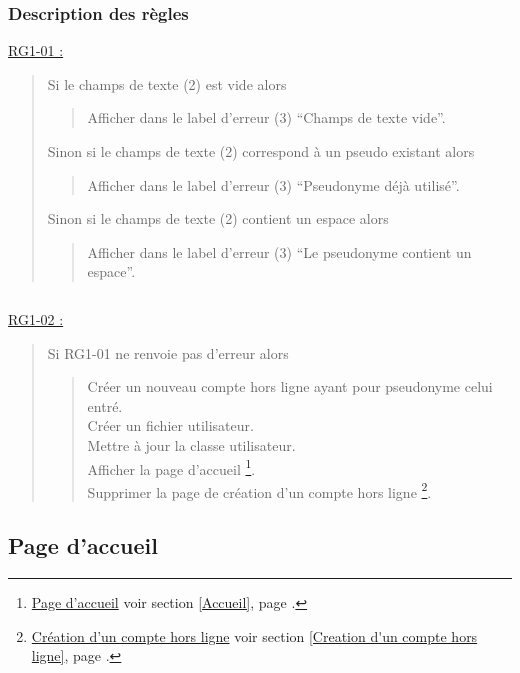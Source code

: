 \documentclass{report}
\begin{document}
		\subsubsection{Description des règles}
		
		\underline{RG1-01 :}
			\begin{quote}
				Si le champs de texte (2) est vide alors
				\begin{quote}
					Afficher dans le label d'erreur (3) ``Champs de texte vide''.
				\end{quote}
				Sinon si le champs de texte (2) correspond à un pseudo existant alors
				\begin{quote}
					Afficher dans le label d'erreur (3) ``Pseudonyme déjà utilisé''.
				\end{quote}
				Sinon si le champs de texte (2) contient un espace alors
				\begin{quote}
					Afficher dans le label d'erreur (3) ``Le pseudonyme contient un espace''.
				\end{quote}
			\end{quote}
		
		$\,$	

		\underline{RG1-02 :}
			\begin{quote}
				Si RG1-01 ne renvoie pas d'erreur alors
				\begin{quote}
					Créer un nouveau compte hors ligne ayant pour pseudonyme celui entré.\\
					Créer un fichier utilisateur.\\
					Mettre à jour la classe utilisateur.\\
					Afficher la page d'accueil%
						\footnote[1]{
							\hyperlink{Page d'accueil}{Page d'accueil}
							\og voir section \ref{Accueil}, page \pageref{Accueil}.\fg
						}.\\
					Supprimer la page de création d'un compte hors ligne%
						\footnote[2]{
							\hyperlink{Creation d'un compte hors ligne}{Création d'un compte hors ligne}
							\og voir section \ref{Creation d'un compte hors ligne}, page \pageref{Creation d'un compte hors ligne}.\fg
						}.
				\end{quote}
			\end{quote}
	
\newpage

	\subsection{Page d'accueil}
		\hypertarget{Accueil}{}
		\label{Accueil}
\end{document}
